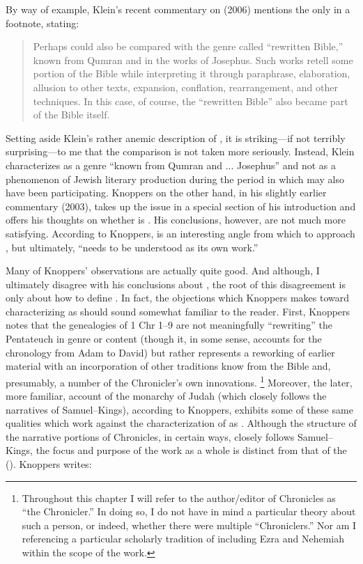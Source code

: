 By way of example, Klein's recent commentary on \chronicles (2006) mentions the \rwb only in a footnote, stating:

\begin{quote}
    Perhaps \chronicles could also be compared with the genre called ``rewritten Bible,'' known from Qumran and in the works of Josephus. Such works retell some portion of the Bible while interpreting it through paraphrase, elaboration, allusion to other texts, expansion, conflation, rearrangement, and other techniques. In this case, of course, the ``rewritten Bible'' also became part of the Bible itself.\autocite[17 n.157]{klein2006}
\end{quote}

Setting aside Klein's rather anemic description of \rwb, it is striking---if not terribly surprising---to me that the comparison is not taken more seriously. Instead, Klein characterizes \rwb as a genre ``known from Qumran and ... Josephus'' and not as a phenomenon of Jewish literary production during the \secondtemple period in which \chronicles may also have been participating. Knoppers on the other hand, in his slightly earlier commentary (2003), takes up the issue in a special section of his introduction and offers his thoughts on whether \chronicles is \rwb.\autocite[129--134]{knoppers2003} His conclusions, however, are not much more satisfying. According to Knoppers, \rwb is an interesting angle from which to approach \chronicles, but ultimately, ``\chronicles needs to be understood as its own work.''\autocite[134]{knoppers2003} 

Many of Knoppers' observations are actually quite good. And although, I ultimately disagree with his conclusions about \chronicles \visavis \rwb, the root of this disagreement is only about how to define \rwb. In fact, the objections which Knoppers makes toward characterizing \chronicles as \rwb should sound somewhat familiar to the reader. First, Knoppers notes that the genealogies of 1 Chr 1--9 are not meaningfully ``rewriting'' the Pentateuch in genre or content (though it, in some sense, accounts for the chronology from Adam to David) but rather represents a reworking of earlier material with an incorporation of other traditions know from the Bible and, presumably, a number of the Chronicler's own innovations.%
    \footnote{Throughout this chapter I will refer to the author/editor of Chronicles as ``the Chronicler.'' In doing so, I do not have in mind a particular theory about such a person, or indeed, whether there were multiple ``Chroniclers.'' Nor am I referencing a particular scholarly tradition of including Ezra and Nehemiah within the scope of the work.}
Moreover, the later, more familiar, account of the monarchy of Judah (which closely follows the narratives of Samuel--Kings), according to Knoppers, exhibits some of these same qualities which work against the characterization of \chronicles as \rwb. Although the structure of the narrative portions of Chronicles, in certain ways, closely follows Samuel--Kings, the focus and purpose of the work as a whole is distinct from that of the \DtrH (\dtrh). Knoppers writes:

